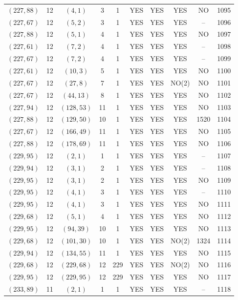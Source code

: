 \begin{longtable}{|c|c|c|c|c|c|c|c|c|c|}
$(227, 88)$ & 12 & $(4, 1)$ & 3 & 1 & YES & YES & YES & NO & 1095\\
$(227, 67)$ & 12 & $(5, 2)$ & 3 & 1 & YES & YES & YES & -- & 1096\\
$(227, 88)$ & 12 & $(5, 1)$ & 4 & 1 & YES & YES & YES & NO & 1097\\
$(227, 61)$ & 12 & $(7, 2)$ & 4 & 1 & YES & YES & YES & -- & 1098\\
$(227, 67)$ & 12 & $(7, 2)$ & 4 & 1 & YES & YES & YES & -- & 1099\\
$(227, 61)$ & 12 & $(10, 3)$ & 5 & 1 & YES & YES & YES & NO & 1100\\
$(227, 67)$ & 12 & $(27, 8)$ & 7 & 1 & YES & YES & NO(2) & NO & 1101\\
$(227, 67)$ & 12 & $(44, 13)$ & 8 & 1 & YES & YES & YES & NO & 1102\\
$(227, 94)$ & 12 & $(128, 53)$ & 11 & 1 & YES & YES & YES & NO & 1103\\
$(227, 88)$ & 12 & $(129, 50)$ & 10 & 1 & YES & YES & YES & 1520 & 1104\\
$(227, 67)$ & 12 & $(166, 49)$ & 11 & 1 & YES & YES & YES & NO & 1105\\
$(227, 88)$ & 12 & $(178, 69)$ & 11 & 1 & YES & YES & YES & NO & 1106\\
$(229, 95)$ & 12 & $(2, 1)$ & 1 & 1 & YES & YES & YES & -- & 1107\\
$(229, 94)$ & 12 & $(3, 1)$ & 2 & 1 & YES & YES & YES & -- & 1108\\
$(229, 95)$ & 12 & $(3, 1)$ & 2 & 1 & YES & YES & YES & NO & 1109\\
$(229, 95)$ & 12 & $(4, 1)$ & 3 & 1 & YES & YES & YES & -- & 1110\\
$(229, 95)$ & 12 & $(4, 1)$ & 3 & 1 & YES & YES & YES & NO & 1111\\
$(229, 68)$ & 12 & $(5, 1)$ & 4 & 1 & YES & YES & YES & NO & 1112\\
$(229, 95)$ & 12 & $(94, 39)$ & 10 & 1 & YES & YES & YES & NO & 1113\\
$(229, 68)$ & 12 & $(101, 30)$ & 10 & 1 & YES & YES & NO(2) & 1324 & 1114\\
$(229, 94)$ & 12 & $(134, 55)$ & 11 & 1 & YES & YES & YES & NO & 1115\\
$(229, 68)$ & 12 & $(229, 68)$ & 12 & 229 & YES & YES & NO(2) & NO & 1116\\
$(229, 95)$ & 12 & $(229, 95)$ & 12 & 229 & YES & YES & YES & NO & 1117\\
$(233, 89)$ & 11 & $(2, 1)$ & 1 & 1 & YES & YES & YES & -- & 1118\\

\end{longtable}
